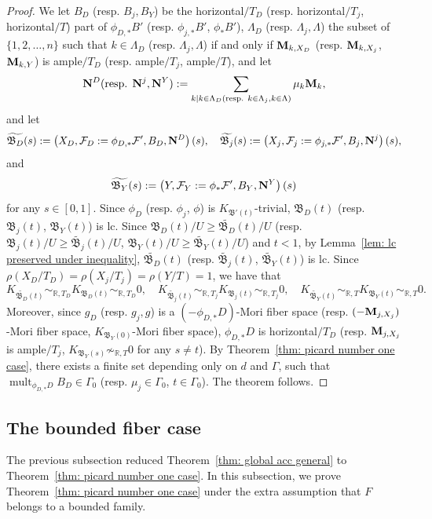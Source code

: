 \documentclass[11pt,reqno]{amsart}
\numberwithin{equation}{section}
\newcommand{\Mm}{{\bf{M}}}
\newcommand{\Nn}{{\bf{N}}}
\newcommand{\mult}{\operatorname{mult}}
\newcommand{\Bb}{{\mathfrak{B}}}
\newcommand{\Ff}{\mathcal{F}}
\newcommand{\Ii}{\Gamma}
\theoremstyle{definition}
\begin{document}
\begin{proof}
We let $B_D$ (resp. $B_j,B_Y$) be the horizontal$/T_D$ (resp. horizontal$/T_j$, horizontal$/T$) part of $\phi_{D,*}B'$ (resp. $\phi_{j,*}B'$, $\phi_{*}B'$), $\Lambda_D$ (resp. $\Lambda_j,\Lambda$) the subset of $\{1,2,\dots,n\}$ such that $k\in\Lambda_D$ (resp. $\Lambda_j,\Lambda$) if and only if $\Mm_{k,X_D}$ (resp. $\Mm_{k,X_j}$, $\Mm_{k,Y}$) is ample$/T_D$ (resp. ample$/T_j$, ample$/T$), and let
$$\Nn^D\text{(resp. }\Nn^j,\Nn^Y\text{)}:=\sum_{k\mid k\in\Lambda_D\text{(resp. }k\in\Lambda_j,k\in\Lambda\text{)}}\mu_k\Mm_k,$$
and let
$$\widetilde{\Bb_D}(s):=\left(X_D,\Ff_D:=\phi_{D,*}\Ff',B_D,\Nn^D\right)(s),\quad \widetilde{\Bb_j}(s):=\left(X_j,\Ff_j:=\phi_{j,*}\Ff',B_j,\Nn^j\right)(s),$$
and 
$$\widetilde{\Bb_Y}(s):=\left(Y,\Ff_Y:=\phi_{*}\Ff',B_Y,\Nn^Y\right)(s)$$
for any $s\in [0,1]$. Since $\phi_D$ (resp. $\phi_j$, $\phi$) is $K_{\Bb'(t)}$-trivial, $\Bb_D(t)$ (resp. $\Bb_j(t)$, $\Bb_Y(t)$) is lc. Since $\Bb_D(t)/U\geq \widetilde{\Bb_D}(t)/U$ (resp. $\Bb_j(t)/U\geq \widetilde{\Bb_j}(t)/U$, $\Bb_Y(t)/U\geq \widetilde{\Bb_Y}(t)/U$) and $t<1$, by Lemma~\ref{lem: lc preserved under inequality}, $\widetilde{\Bb_D}(t)$ (resp. $\widetilde{\Bb_j}(t)$, $\widetilde{\Bb_Y}(t)$) is lc. Since $\rho(X_D/T_D)=\rho(X_j/T_j)=\rho(Y/T)=1$, we have that
$$K_{\widetilde{\Bb_D}(t)}\sim_{\mathbb R,T_D}K_{\Bb_D(t)}\sim_{\mathbb R,T_D}0,\quad K_{\widetilde{\Bb_j}(t)}\sim_{\mathbb R,T_j}K_{\Bb_j(t)}\sim_{\mathbb R,T_j}0,\quad K_{\widetilde{\Bb_Y}(t)}\sim_{\mathbb R,T}K_{\Bb_Y(t)}\sim_{\mathbb R,T}0.$$
Moreover, since $g_D$ (resp. $g_j,g$) is a $(-\phi_{D,*}D)$-Mori fiber space (resp. $(-\Mm_{j,X_j})$-Mori fiber space, $K_{\Bb_Y(0)}$-Mori fiber space), $\phi_{D,*}D$ is horizontal$/T_D$ (resp. $\Mm_{j,X_j}$ is ample$/T_j$, $K_{\Bb_Y(s)}\not\sim_{\mathbb R,T}0$ for any $s\neq t$). By Theorem~\ref{thm: picard number one case}, there exists a finite set depending only on $d$ and $\Ii$, such that $\mult_{\phi_{D,*}D}B_D\in\Ii_0$ (resp. $\mu_j\in\Ii_0$, $t\in\Ii_0$). The theorem follows.
\end{proof}

\subsection{The bounded fiber case}

The previous subsection reduced Theorem~\ref{thm: global acc general} to Theorem~\ref{thm: picard number one case}. In this subsection, we prove Theorem~\ref{thm: picard number one case} under the extra assumption that $F$ belongs to a bounded family.
\end{document}
